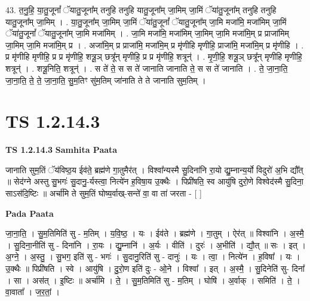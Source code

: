 \documentclass[17pt]{extarticle}
\begin{document}
43. त॒नु॒हि॒ या॒तु॒जूनां᳚ ॅयातु॒जूना᳚म् तनुहि तनुहि यातु॒जूना᳚म् जा॒मिम् जा॒मिं ॅया॑तु॒जूना᳚म् तनुहि तनुहि यातु॒जूना᳚म् जा॒मिम् । . या॒तु॒जूना᳚म् जा॒मिम् जा॒मिं ॅया॑तु॒जूनां᳚ ॅयातु॒जूना᳚म् जा॒मि मजा॑मि॒ मजा॑मिम् जा॒मिं ॅया॑तु॒जूनां᳚ ॅयातु॒जूना᳚म् जा॒मि मजा॑मिम् । . जा॒मि मजा॑मि॒ मजा॑मिम् जा॒मिम् जा॒मि मजा॑मि॒म् प्र प्राजा॑मिम् जा॒मिम् जा॒मि मजा॑मि॒म् प्र । . अजा॑मि॒म् प्र प्राजा॑मि॒ मजा॑मि॒म् प्र मृ॑णीहि मृणीहि॒ प्राजा॑मि॒ मजा॑मि॒म् प्र मृ॑णीहि । . प्र मृ॑णीहि मृणीहि॒ प्र प्र मृ॑णीहि॒ शत्रू॒ञ् छत्रू᳚न् मृणीहि॒ प्र प्र मृ॑णीहि॒ शत्रून्॑ । . मृ॒णी॒हि॒ शत्रू॒ञ् छत्रू᳚न् मृणीहि मृणीहि॒ शत्रून्॑ । . शत्रू॒निति॒ शत्रून्॑ । . स ते॑ ते॒ स स ते॑ जानाति जानाति ते॒ स स ते॑ जानाति । . ते॒ जा॒ना॒ति॒ जा॒ना॒ति॒ ते॒ ते॒ जा॒ना॒ति॒ सु॒म॒तिꣳ सु॑म॒तिम् जा॑नाति ते ते जानाति सुम॒तिम् । \newline
\pagebreak
{}

\section{ TS 1.2.14.3 }

\textbf{TS 1.2.14.3 } \newline
\textbf{Samhita Paata} \newline

जानाति सुम॒तिं ॅय॑विष्ठ॒य ईव॑ते॒ ब्रह्म॑णे गा॒तुमैर॑त् । विश्वा᳚न्यस्मै सु॒दिना॑नि रा॒यो द्यु॒म्नान्य॒र्यो विदुरो॑ अ॒भि द्यौ᳚त् ॥ सेद॑ग्ने अस्तु सु॒भगः॑ सु॒दानु॒-र्यस्त्वा॒ नित्ये॑न ह॒विषा॒य उ॒क्थैः । पिप्री॑षति॒ स्व आयु॑षि दुरो॒णे विश्वेद॑स्मै सु॒दिना॒ साऽस॑दि॒ष्टिः ॥ अर्चा॑मि ते सुम॒तिं घोष्य॒र्वाख्-सन्ते॑ वा॒ वा ता॑ जरता - [ ] \newline

\textbf{Pada Paata} \newline

जा॒ना॒ति॒ । सु॒म॒तिमिति॑ सु - म॒तिम् । य॒वि॒ष्ठ॒ । यः । ईव॑ते । ब्रह्म॑णे । गा॒तुम् । ऐर॑त् ॥ विश्वा॑नि । अ॒स्मै॒ । सु॒दिना॒नीति॑ सु - दिना॑नि । रा॒यः । द्यु॒म्नानि॑ । अ॒र्यः । वीति॑ । दुरः॑ । अ॒भीति॑ । द्यौ॒त् ॥ सः । इत् । अ॒ग्ने॒ । अ॒स्तु॒ । सु॒भग॒ इति॑ सु - भगः॑ । सु॒दानु॒रिति॑ सु - दानुः॑ । यः । त्वा॒ । नित्ये॑न । ह॒विषा᳚ । यः । उ॒क्थैः ॥ पिप्री॑षति । स्वे । आयु॑षि । दु॒रो॒ण इति॑ दुः - ओ॒ने । विश्वा᳚ । इत् । अ॒स्मै॒ । सु॒दिनेति॑ सु- दिना᳚ । सा । अस॑त् । इ॒ष्टिः ॥ अर्चा॑मि । ते॒ । सु॒म॒तिमिति॑ सु - म॒तिम् । घोषि॑ । अ॒र्वाक् । समिति॑ । ते॒ । वा॒वाता᳚ । ज॒र॒तां॒ ।  \newline
\end{document}
